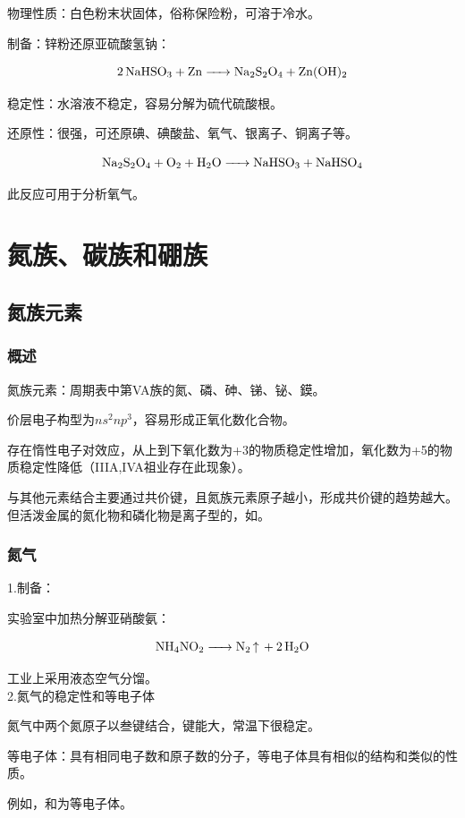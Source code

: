 \documentclass[a4paper,UTF8]{article}
\begin{document}
物理性质：白色粉末状固体，俗称保险粉，可溶于冷水。

制备：锌粉还原亚硫酸氢钠：

$$ \ce{2NaHSO3 + Zn -> Na2S2O4 + Zn(OH)2} $$

稳定性：水溶液不稳定，容易分解为硫代硫酸根。

还原性：很强，可还原碘、碘酸盐、氧气、银离子、铜离子等。

$$ \ce{Na2S2O4 + O2 + H2O -> NaHSO3 + NaHSO4} $$

此反应可用于分析氧气。

\section{氮族、碳族和硼族}

\subsection{氮族元素}

\subsubsection{概述}

氮族元素：周期表中第VA族的氮、磷、砷、锑、铋、鏌。

价层电子构型为$ns^2np^3$，容易形成正氧化数化合物。

存在惰性电子对效应，从上到下氧化数为+3的物质稳定性增加，氧化数为+5的物质稳定性降低（IIIA,IVA祖业存在此现象）。

与其他元素结合主要通过共价键，且氮族元素原子越小，形成共价键的趋势越大。但活泼金属的氮化物和磷化物是离子型的，如。

\subsubsection{氮气}

1.制备：

实验室中加热分解亚硝酸氨：

$$ \ce{NH4NO2 -> N2 ^ + 2H2O} $$

工业上采用液态空气分馏。\\

2.氮气的稳定性和等电子体

氮气中两个氮原子以叁键结合，键能大，常温下很稳定。

等电子体：具有相同电子数和原子数的分子，等电子体具有相似的结构和类似的性质。

例如，和为等电子体。
\end{document}
